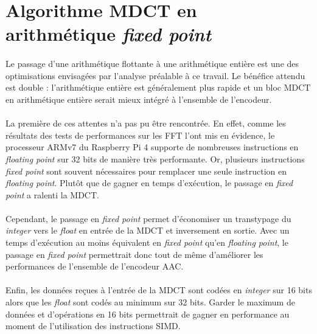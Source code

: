 \documentclass{article}
\begin{document}
    \newpage
    \section{Algorithme MDCT en arithmétique \emph{fixed point}}%
    \label{sec:fixed_point}
    \paragraph{}
    Le passage d'une arithmétique flottante à une arithmétique entière est une des optimisations envisagées par l'analyse préalable à ce travail. Le bénéfice attendu est double : l'arithmétique entière est généralement plus rapide et un bloc MDCT en arithmétique entière serait mieux intégré à l'ensemble de l'encodeur.

    \paragraph{}
    La première de ces attentes n'a pas pu être rencontrée. En effet, comme les résultats des tests de performances sur les FFT l'ont mis en évidence, le processeur ARMv7 du Raspberry Pi 4 supporte de nombreuses instructions en \emph{floating point} sur 32 bits de manière très performante\cite{DOC-ARM}. Or, plusieurs instructions \emph{fixed point} sont souvent nécessaires pour remplacer une seule instruction en \emph{floating point}. Plutôt que de gagner en temps d'exécution, le passage en \emph{fixed point} a ralenti la MDCT.

    \paragraph{}
    Cependant, le passage en \emph{fixed point} permet d'économiser un transtypage du \emph{integer} vers le \emph{float} en entrée de la MDCT et inversement en sortie. Avec un temps d'exécution au moins équivalent en \emph{fixed point} qu'en \emph{floating point}, le passage en \emph{fixed point} permettrait donc tout de même d'améliorer les performances de l'ensemble de l'encodeur AAC.

    \paragraph{}
    Enfin, les données reçues à l'entrée de la MDCT sont codées en \emph{integer} sur 16 bits alors que les \emph{float} sont codés au minimum sur 32 bits. Garder le maximum de données et d'opérations en 16 bits permettrait de gagner en performance au moment de l'utilisation des instructions SIMD.
\end{document}
